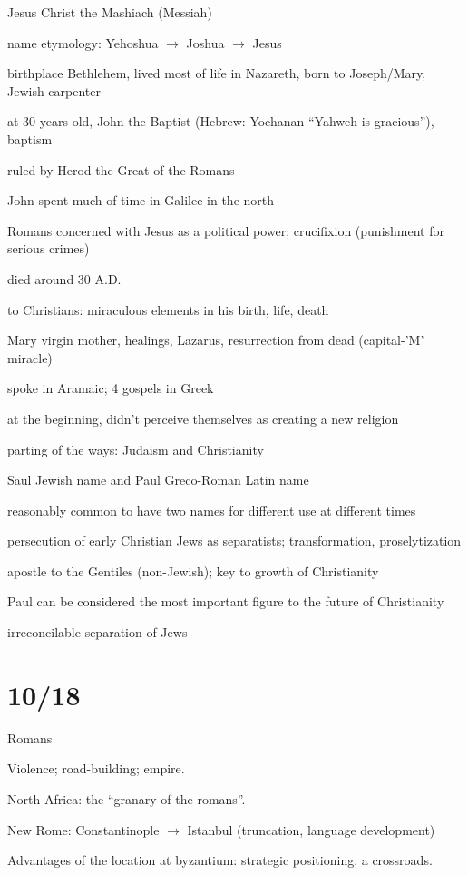 \documentclass[12pt]{article}
\begin{document}
\noindent
Jesus Christ the Mashiach (Messiah)

name etymology: Yehoshua $\to$ Joshua $\to$ Jesus

birthplace Bethlehem, lived most of life in Nazareth, born to Joseph/Mary, Jewish carpenter

at 30 years old, John the Baptist (Hebrew: Yochanan ``Yahweh is gracious''), baptism

ruled by Herod the Great of the Romans

John spent much of time in Galilee in the north

Romans concerned with Jesus as a political power; crucifixion (punishment for serious crimes)

died around 30 A.D.

to Christians: miraculous elements in his birth, life, death

Mary virgin mother, healings, Lazarus, resurrection from dead (capital-'M' miracle)

spoke in Aramaic; 4 gospels in Greek

at the beginning, didn't perceive themselves as creating a new religion

parting of the ways: Judaism and Christianity

Saul Jewish name and Paul Greco-Roman Latin name

reasonably common to have two names for different use at different times

persecution of early Christian Jews as separatists; transformation, proselytization

apostle to the Gentiles (non-Jewish); key to growth of Christianity

Paul can be considered the most important figure to the future of Christianity

irreconcilable separation of Jews

\section{10/18}

\noindent
Romans

Violence; road-building; empire.

North Africa: the ``granary of the romans''.

New Rome: Constantinople $\to$ Istanbul (truncation, language development)

Advantages of the location at byzantium: strategic positioning, a crossroads.
\end{document}

